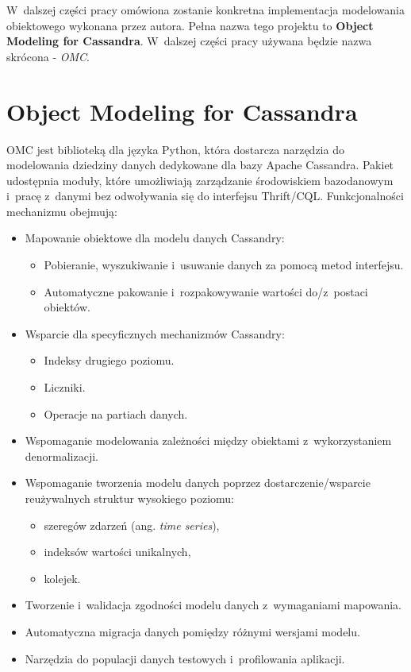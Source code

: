 W~dalszej części pracy omówiona zostanie konkretna implementacja modelowania obiektowego wykonana przez autora. Pełna nazwa tego projektu to \textbf{Object Modeling for Cassandra}. W~dalszej części pracy używana będzie nazwa skrócona - \emph{OMC}.

\section{Object Modeling for Cassandra}
\label{sec:ocm_library_description}

OMC jest biblioteką dla języka Python, która dostarcza narzędzia do modelowania dziedziny danych dedykowane dla bazy Apache Cassandra. Pakiet udostępnia moduły, które umożliwiają zarządzanie środowiskiem bazodanowym i~pracę z~danymi bez odwoływania się do interfejsu Thrift/CQL. Funkcjonalności mechanizmu obejmują:

\begin{itemize}
	\item Mapowanie obiektowe dla modelu danych Cassandry:
		\begin{itemize}
			\item Pobieranie, wyszukiwanie i~usuwanie danych za pomocą metod interfejsu.
			\item Automatyczne pakowanie i~rozpakowywanie wartości do/z~postaci obiektów.
		\end{itemize}
	\item Wsparcie dla specyficznych mechanizmów Cassandry:
		\begin{itemize}
			\item Indeksy drugiego poziomu.
			\item Liczniki.
			\item Operacje na partiach danych.
		\end{itemize}
	\item Wspomaganie modelowania zależności między obiektami z~wykorzystaniem denormalizacji.
	\item Wspomaganie tworzenia modelu danych poprzez dostarczenie/wsparcie reużywalnych struktur wysokiego poziomu:
		\begin{itemize}
			\item szeregów zdarzeń (ang. \emph{time series}),
			\item indeksów wartości unikalnych,
			\item kolejek.
		\end{itemize}
	\item Tworzenie i~walidacja zgodności modelu danych z~wymaganiami mapowania.
	\item Automatyczna migracja danych pomiędzy różnymi wersjami modelu.
	\item Narzędzia do populacji danych testowych i~profilowania aplikacji. 
\end{itemize}

